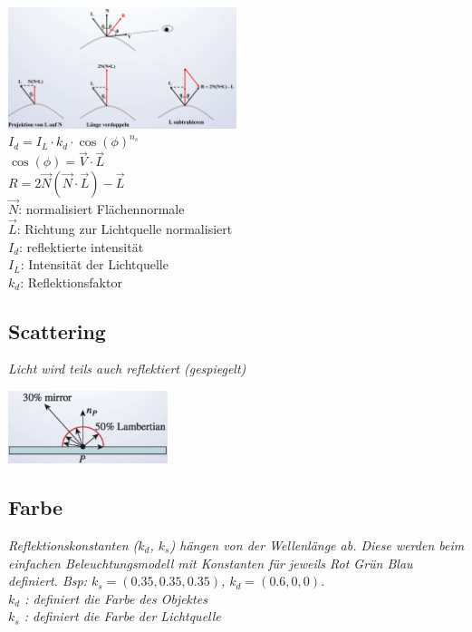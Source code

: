 \includegraphics[width=0.5\textwidth]{assets/phong-modell.png}\\

$I_d = I_L \cdot k_d \cdot \cos(\phi)^{n_s}$ \\
$\cos(\phi) = \vec{V} \cdot \vec{L}$ \\
$R = 2\vec{N}(\vec{N} \cdot \vec{L}) - \vec{L}$ \\

$\vec{N}$: normalisiert Flächennormale \\
$\vec{L}$: Richtung zur Lichtquelle normalisiert \\
$I_d$: reflektierte intensität \\
$I_L$: Intensität der Lichtquelle \\
$k_d$: Reflektionsfaktor \\

\subsection{Scattering}

\textit{Licht wird teils auch reflektiert (gespiegelt)}

\includegraphics[width=0.35\textwidth]{assets/scattering-model.png}\\

\subsection{Farbe}

\textit{Reflektionskonstanten ($k_d$, $k_s$) hängen von der Wellenlänge ab.
    Diese werden beim einfachen Beleuchtungsmodell mit Konstanten für jeweils
    Rot Grün Blau definiert. Bsp: $k_s = (0.35,0.35,0.35)$, $k_d = (0.6,0,0)$.
}\\

\textit{$k_d$ : definiert die Farbe des Objektes}\\
\textit{$k_s$ : definiert die Farbe der Lichtquelle}

